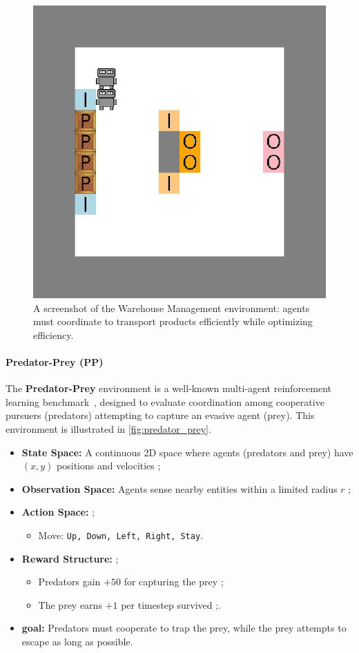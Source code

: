 \documentclass[pdflatex,sn-mathphys-num]{sn-jnl}%
\theoremstyle{thmstyleone}%
\theoremstyle{thmstyletwo}%
\theoremstyle{thmstylethree}%
\begin{document}
\begin{figure}[h!]
  \centering
  \includegraphics[width=0.7\linewidth]{figures/wm.png}
  \caption{A screenshot of the Warehouse Management environment: agents must coordinate to transport products efficiently while optimizing efficiency.}
  \label{fig:warehouse}
\end{figure}

\paragraph{Predator-Prey (PP)}
The \textbf{Predator-Prey} environment is a well-known multi-agent reinforcement learning benchmark~\cite{lowe2017multi}, designed to evaluate coordination among cooperative pursuers (predators) attempting to capture an evasive agent (prey). This environment is illustrated in \autoref{fig:predator_prey}.

\begin{itemize}
    \item \textbf{State Space:} A continuous 2D space where agents (predators and prey) have $(x, y)$ positions and velocities ;
    \item \textbf{Observation Space:} Agents sense nearby entities within a limited radius $r$ ;
    \item \textbf{Action Space:}  ;
    \begin{itemize}
        \item Move: \texttt{Up, Down, Left, Right, Stay}.
    \end{itemize}
    \item \textbf{Reward Structure:} ;
    \begin{itemize}
        \item Predators gain $+50$ for capturing the prey ;
        \item The prey earns $+1$ per timestep survived ;.
    \end{itemize}
    \item \textbf{goal:} Predators must cooperate to trap the prey, while the prey attempts to escape as long as possible.
\end{itemize}
\end{document}
